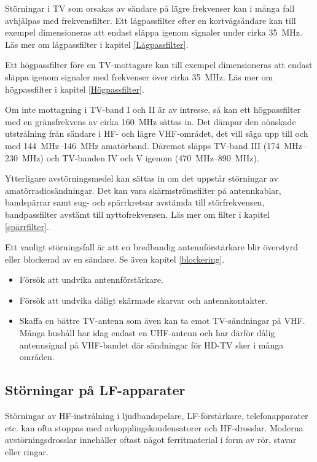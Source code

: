 Störningar i TV som orsakas av sändare på lägre frekvenser kan i många fall
avhjälpas med frekvensfilter.
Ett lågpassfilter efter en kortvågsändare kan till exempel dimensioneras att
endast släppa igenom signaler under cirka \SI{35}{\mega\hertz}.
Läs mer om lågpassfilter i kapitel \ref{Lågpassfilter}.

Ett högpassfilter före en TV-mottagare kan till exempel dimensioneras att
endast släppa igenom signaler med frekvenser över cirka \SI{35}{\mega\hertz}.
Läs mer om högpassfilter i kapitel \ref{Högpassfilter}.

Om inte mottagning i TV-band I och II är av intresse, så kan ett högpassfilter
med en gränsfrekvens av cirka \SI{160}{\mega\hertz} sättas in.
Det dämpar den oönskade utstrålning från sändare i HF- och lägre VHF-området,
det vill säga upp till och med \SIrange{144}{146}{\mega\hertz} amatörband.
Däremot släpps TV-band III (\SIrange{174}{230}{\mega\hertz}) och TV-banden IV
och V igenom (\SIrange{470}{890}{\mega\hertz}).

Ytterligare avstörningsmedel kan sättas in om det uppstår störningar av
amatörradiosändningar.
Det kan vara skärmströmsfilter på antennkablar, bandspärrar samt sug- och
spärrkretsar avstämda till störfrekvensen, bandpassfilter avstämt till
nyttofrekvensen. Läs mer om filter i kapitel \ref{spärrfilter}.

Ett vanligt störningsfall är att en bredbandig antennförstärkare blir
överstyrd eller blockerad av en sändare. Se även kapitel \ref{blockering}.

\begin{itemize}
\item Försök att undvika antennförstärkare.
\item Försök att undvika dåligt skärmade skarvar och antennkontakter.
\item Skaffa en bättre TV-antenn som även kan ta emot TV-sändningar på VHF.
  Många hushåll har idag endast en UHF-antenn och har därför dålig
  antennsignal på VHF-bandet där sändningar för HD-TV sker i många områden.
\end{itemize}

\subsection{Störningar på LF-apparater}

Störningar av HF-instrålning i ljudbandspelare, LF-förstärkare, telefonapparater
etc. kan ofta stoppas med avkopplingskondensatorer och HF-drosslar.
Moderna avstörningsdrosslar innehåller oftast något ferritmaterial i form av
rör, stavar eller ringar.
